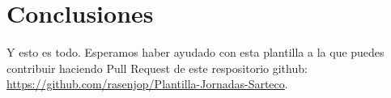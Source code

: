 \section{Conclusiones}

Y esto es todo. Esperamos haber ayudado con esta plantilla a la que puedes
contribuir haciendo Pull Request de este respositorio github: \url{https://github.com/rasenjop/Plantilla-Jornadas-Sarteco}.